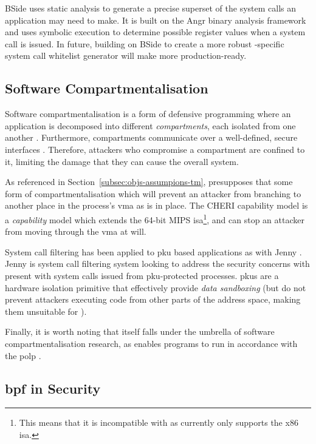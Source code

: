 BSide \cite{BSIDE} uses static analysis to generate a precise
superset of the system calls an application may need to make. It is built on 
the Angr \cite{angr2025} binary analysis framework and uses symbolic execution
to determine possible register values when a system call is issued. In future,
building on BSide to create a more robust \af-specific system call whitelist
generator will make \af more production-ready.

\subsection{Software Compartmentalisation}

Software compartmentalisation is a form of defensive programming where an
application is decomposed into different \textit{compartments}, each isolated
from one another \cite{SOK}. Furthermore, compartments communicate over a
well-defined, secure interfaces \cite{CONFFUZZ}. Therefore, attackers who
compromise a compartment are confined to it, limiting the damage that they can
cause the overall system.

As referenced in Section~\ref{subsec:objs-assumpions-tm}, \af presupposes that some
form of compartmentalisation which will prevent an attacker from branching to
another place in the process's \ac{vma} as is in place. The CHERI capability
model \cite{CHERI} is a \textit{capability} model which extends the 64-bit MIPS
\ac{isa}\footnote{This means that it is incompatible with \af as \af
currently only supports the x86 \ac{isa}.}, and can stop an attacker from moving through the
\ac{vma} at will. 

System call filtering has been applied to \ac{pku} based applications as with
Jenny \cite{JENNY}. Jenny is system call filtering system looking to address
the security concerns with present with system calls issued from
\ac{pku}-protected processes. \acp{pku} are a hardware isolation primitive that
effectively provide \textit{data sandboxing} (but do not prevent attackers
executing code from other parts of the address space, making them unsuitable for
\af).

Finally, it is worth noting that \af itself falls under the umbrella of software
compartmentalisation research, as \af enables programs to run in accordance with
the \ac{polp} \cite{SALTZER_SCHROEDER}.

\subsection{\ac{bpf} in Security}\label{subsec:bpf-in-security}

